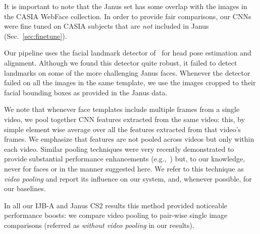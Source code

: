\documentclass[runningheads]{llncs}
\newcommand{\minisection}[1]{\vspace{0.04in} \noindent {\bf #1:} }
\begin{document}
It is important to note that the Janus set has some overlap with the images in the CASIA WebFace collection. In order to provide fair comparisons, our CNNs were fine tuned on CASIA subjects that are {\em not} included in Janus (Sec.~\ref{sec:finetune}).


\minisection{Face detections} Our pipeline uses the facial landmark detector of~\cite{lp:landmark} for head pose estimation and alignment. Although we found this detector quite robust, it failed to detect landmarks on some of the more challenging Janus faces. Whenever the detector failed on all the images in the same template, we use the images cropped to their facial bounding boxes as provided in the Janus data. 

\minisection{Video pooling} We note that whenever face templates include multiple frames from a single video, we pool together CNN features extracted from the same video: this, by simple element wise average over all the features extracted from that video's frames. We emphasize that features are not pooled across videos but only within each video. Similar pooling techniques were very recently demonstrated to provide substantial performance enhancements (e.g.,~\cite{su2015multi}) but, to our knowledge, never for faces or in the manner suggested here. We refer to this technique as {\em video pooling} and report its influence on our system, and, whenever possible, for our baselines. 

In all our IJB-A and Janus CS2 results this method provided noticeable performance boosts: we compare video pooling to pair-wise single image comparisons (referred as {\em without video pooling} in our results). 
\end{document}
